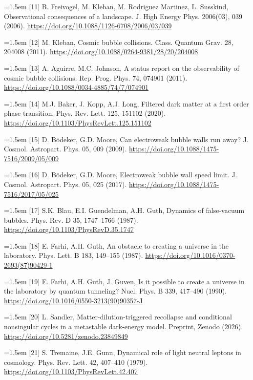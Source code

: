 \documentclass[preprint,12pt]{elsarticle}
\begin{document}
\noindent\hangindent=1.5em [11] B. Freivogel, M. Kleban, M. Rodriguez Martinez, L. Susskind, Observational consequences of a landscape. J. High Energy Phys. 2006(03), 039 (2006). \url{https://doi.org/10.1088/1126-6708/2006/03/039}\par
\noindent\hangindent=1.5em [12] M. Kleban, Cosmic bubble collisions. Class. Quantum Grav. 28, 204008 (2011). \url{https://doi.org/10.1088/0264-9381/28/20/204008}\par
\noindent\hangindent=1.5em [13] A. Aguirre, M.C. Johnson, A status report on the observability of cosmic bubble collisions. Rep. Prog. Phys. 74, 074901 (2011). \url{https://doi.org/10.1088/0034-4885/74/7/074901}\par
\noindent\hangindent=1.5em [14] M.J. Baker, J. Kopp, A.J. Long, Filtered dark matter at a first order phase transition. Phys. Rev. Lett. 125, 151102 (2020). \url{https://doi.org/10.1103/PhysRevLett.125.151102}\par
\noindent\hangindent=1.5em [15] D. Bödeker, G.D. Moore, Can electroweak bubble walls run away? J. Cosmol. Astropart. Phys. 05, 009 (2009). \url{https://doi.org/10.1088/1475-7516/2009/05/009}\par
\noindent\hangindent=1.5em [16] D. Bödeker, G.D. Moore, Electroweak bubble wall speed limit. J. Cosmol. Astropart. Phys. 05, 025 (2017). \url{https://doi.org/10.1088/1475-7516/2017/05/025}\par
\noindent\hangindent=1.5em [17] S.K. Blau, E.I. Guendelman, A.H. Guth, Dynamics of false-vacuum bubbles. Phys. Rev. D 35, 1747--1766 (1987). \url{https://doi.org/10.1103/PhysRevD.35.1747}\par
\noindent\hangindent=1.5em [18] E. Farhi, A.H. Guth, An obstacle to creating a universe in the laboratory. Phys. Lett. B 183, 149--155 (1987). \url{https://doi.org/10.1016/0370-2693(87)90429-1}\par
\noindent\hangindent=1.5em [19] E. Farhi, A.H. Guth, J. Guven, Is it possible to create a universe in the laboratory by quantum tunneling? Nucl. Phys. B 339, 417--490 (1990). \url{https://doi.org/10.1016/0550-3213(90)90357-J}\par
\noindent\hangindent=1.5em [20] L. Sandler, Matter-dilution-triggered recollapse and conditional nonsingular cycles in a metastable dark-energy model. Preprint, Zenodo (2026). \url{https://doi.org/10.5281/zenodo.23849849}\par
\noindent\hangindent=1.5em [21] S. Tremaine, J.E. Gunn, Dynamical role of light neutral leptons in cosmology. Phys. Rev. Lett. 42, 407--410 (1979). \url{https://doi.org/10.1103/PhysRevLett.42.407}\par
\end{document}

